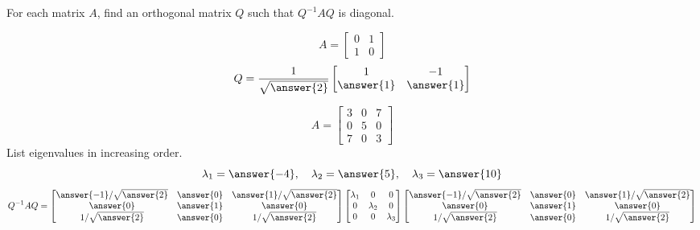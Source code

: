 \documentclass{ximera}
\begin{document}
\begin{problem}\label{prob:findQ}
For each matrix $A$, find an orthogonal matrix $Q$ such that $Q^{-1}AQ$ is diagonal.

\begin{question}
$$A = \begin{bmatrix}
0 & 1 \\
1 & 0
\end{bmatrix}$$
$$Q=\frac{1}{\sqrt{\answer{2}}}\begin{bmatrix}1 & -1\\\answer{1} & \answer{1}\end{bmatrix}$$
\end{question}

\begin{question}
    $$A = \begin{bmatrix}
3 & 0 & 7 \\
0 & 5 & 0 \\
7 & 0 & 3
\end{bmatrix}$$
List eigenvalues in increasing order.
$$\lambda_1=\answer{-4},\quad\lambda_2=\answer{5},\quad\lambda_3=\answer{10}$$
$$Q^{-1}AQ=\begin{bmatrix}\answer{-1}/\sqrt{\answer{2}} & \answer{0} & \answer{1}/\sqrt{\answer{2}}\\\answer{0} & \answer{1} & \answer{0}\\1/\sqrt{\answer{2}} & \answer{0} & 1/\sqrt{\answer{2}}\end{bmatrix}\begin{bmatrix}\lambda_1 & 0 & 0\\0 & \lambda_2 & 0\\0 & 0& \lambda_3\end{bmatrix}\begin{bmatrix}\answer{-1}/\sqrt{\answer{2}} & \answer{0} & \answer{1}/\sqrt{\answer{2}}\\\answer{0} & \answer{1} & \answer{0}\\1/\sqrt{\answer{2}} & \answer{0} & 1/\sqrt{\answer{2}}\end{bmatrix}$$
\end{question}



\end{problem}
\end{document}
